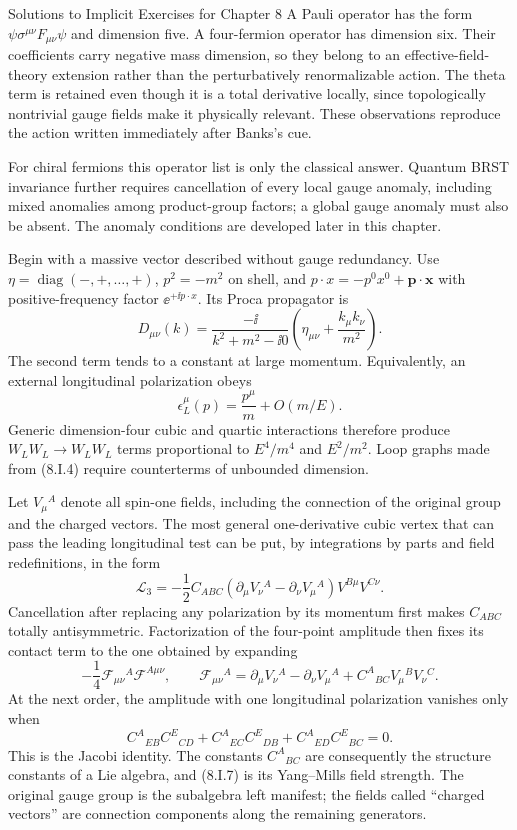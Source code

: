 \begin{bankssolutions}{Solutions to Implicit Exercises for Chapter 8}
A Pauli operator has the form
$\psi\sigma^{\mu\nu}F_{\mu\nu}\psi$ and dimension five.  A four-fermion
operator has dimension six.  Their coefficients carry negative mass
dimension, so they belong to an effective-field-theory extension rather than
the perturbatively renormalizable action.  The theta term is retained even
though it is a total derivative locally, since topologically nontrivial gauge
fields make it physically relevant.  These observations reproduce the action
written immediately after Banks's cue.

For chiral fermions this operator list is only the classical answer.  Quantum
BRST invariance further requires cancellation of every local gauge anomaly,
including mixed anomalies among product-group factors; a global gauge anomaly
must also be absent.  The anomaly conditions are developed later in this
chapter.

Begin with a massive vector described without gauge redundancy.  Use
$\eta=\operatorname{diag}(-,+,\ldots,+)$, $p^2=-m^2$ on shell, and
$p\cdot x=-p^0x^0+\mathbf p\cdot\mathbf x$ with positive-frequency factor
$\ee^{+\ii p\cdot x}$.  Its Proca propagator is
\[
 D_{\mu\nu}(k)=\frac{-\ii}{k^2+m^2-\ii0}
 \left(\eta_{\mu\nu}+\frac{k_\mu k_\nu}{m^2}\right).
 \tag{8.I.4}
\]
The second term tends to a constant at large momentum.  Equivalently, an
external longitudinal polarization obeys
\[
 \epsilon_L^\mu(p)=\frac{p^\mu}{m}+O(m/E).
 \tag{8.I.5}
\]
Generic dimension-four cubic and quartic interactions therefore produce
$W_LW_L\to W_LW_L$ terms proportional to $E^4/m^4$ and $E^2/m^2$.  Loop
graphs made from (8.I.4) require counterterms of unbounded dimension.

Let $V_\mu{}^A$ denote all spin-one fields, including the connection of the
original group and the charged vectors.  The most general one-derivative
cubic vertex that can pass the leading longitudinal test can be put, by
integrations by parts and field redefinitions, in the form
\[
 \mathcal L_3=-\frac12 C_{ABC}
 (\partial_\mu V_\nu{}^A-\partial_\nu V_\mu{}^A)V^{B\mu}V^{C\nu}.
 \tag{8.I.6}
\]
Cancellation after replacing any polarization by its momentum first makes
$C_{ABC}$ totally antisymmetric.  Factorization of the four-point amplitude
then fixes its contact term to the one obtained by expanding
\[
 -\frac14\mathcal F_{\mu\nu}{}^A\mathcal F^{A\mu\nu},
 \qquad
 \mathcal F_{\mu\nu}{}^A=\partial_\mu V_\nu{}^A-\partial_\nu V_\mu{}^A
 +C^A{}_{BC}V_\mu{}^BV_\nu{}^C.
 \tag{8.I.7}
\]
At the next order, the amplitude with one longitudinal polarization vanishes
only when
\[
 C^A{}_{EB}C^E{}_{CD}+C^A{}_{EC}C^E{}_{DB}
 +C^A{}_{ED}C^E{}_{BC}=0.
 \tag{8.I.8}
\]
This is the Jacobi identity.  The constants $C^A{}_{BC}$ are consequently
the structure constants of a Lie algebra, and (8.I.7) is its Yang--Mills
field strength.  The original gauge group is the subalgebra left manifest;
the fields called ``charged vectors'' are connection components along the
remaining generators.


\end{bankssolutions}
